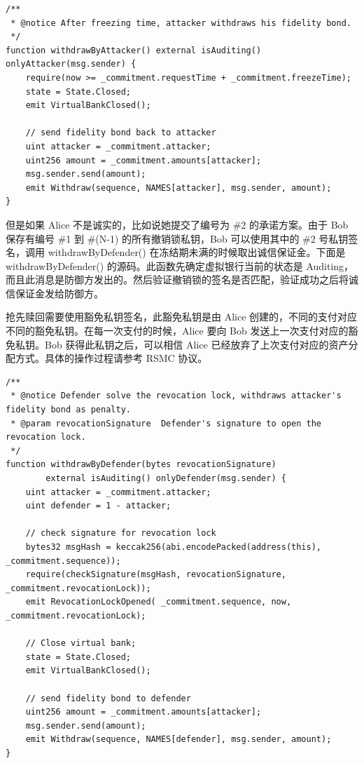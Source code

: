 \begin{lstlisting}[caption={锁定时间过后，进攻方取回诚信保证金}, label={lst:withdrawByAttacker}]
/**
 * @notice After freezing time, attacker withdraws his fidelity bond.
 */
function withdrawByAttacker() external isAuditing() onlyAttacker(msg.sender) {
    require(now >= _commitment.requestTime + _commitment.freezeTime);
    state = State.Closed;
    emit VirtualBankClosed();

    // send fidelity bond back to attacker
    uint attacker = _commitment.attacker;
    uint256 amount = _commitment.amounts[attacker];
    msg.sender.send(amount);
    emit Withdraw(sequence, NAMES[attacker], msg.sender, amount);
}
\end{lstlisting}

但是如果 Alice 不是诚实的，比如说她提交了编号为 \#2 的承诺方案。由于 Bob 保存有编号 \#1 到 \#(N-1) 的所有撤销锁私钥，Bob 可以使用其中的 \#2 号私钥签名，调用 withdrawByDefender() 在冻结期未满的时候取出诚信保证金。下面是 withdrawByDefender() 的源码。此函数先确定虚拟银行当前的状态是 Auditing，而且此消息是防御方发出的。然后验证撤销锁的签名是否匹配，验证成功之后将诚信保证金发给防御方。

抢先赎回需要使用豁免私钥签名，此豁免私钥是由 Alice 创建的，不同的支付对应不同的豁免私钥。在每一次支付的时候，Alice 要向 Bob 发送上一次支付对应的豁免私钥。Bob 获得此私钥之后，可以相信 Alice 已经放弃了上次支付对应的资产分配方式。具体的操作过程请参考 RSMC 协议。

\begin{lstlisting}[caption={锁定时间内，防御方取出诚信保证金}, label={lst:withdrawByDefender}]
/**
 * @notice Defender solve the revocation lock, withdraws attacker's fidelity bond as penalty.
 * @param revocationSignature  Defender's signature to open the revocation lock.
 */
function withdrawByDefender(bytes revocationSignature) 
        external isAuditing() onlyDefender(msg.sender) {
    uint attacker = _commitment.attacker;
    uint defender = 1 - attacker;
    
    // check signature for revocation lock
    bytes32 msgHash = keccak256(abi.encodePacked(address(this), _commitment.sequence));
    require(checkSignature(msgHash, revocationSignature, _commitment.revocationLock));
    emit RevocationLockOpened( _commitment.sequence, now, _commitment.revocationLock);
    
    // Close virtual bank;
    state = State.Closed;
    emit VirtualBankClosed();
    
    // send fidelity bond to defender
    uint256 amount = _commitment.amounts[attacker];
    msg.sender.send(amount);
    emit Withdraw(sequence, NAMES[defender], msg.sender, amount);
}
\end{lstlisting}

